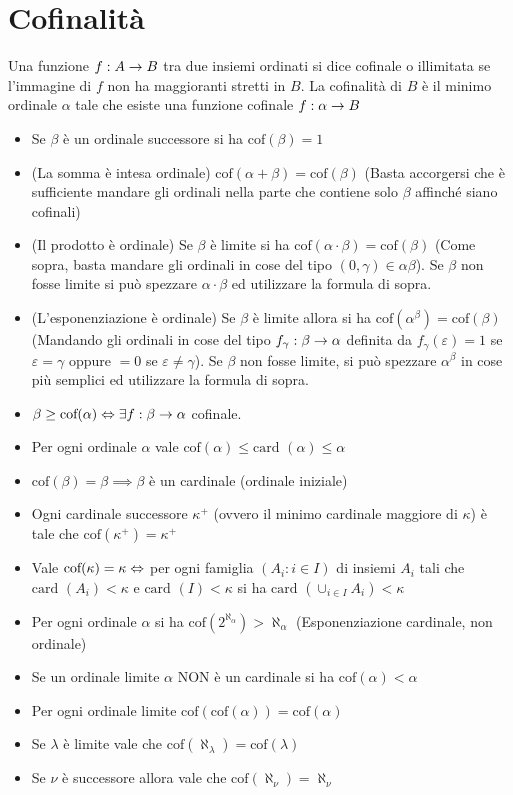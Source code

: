 \documentclass[a4paper,NoNotes,GeneralMath]{stdmdoc}
\newcommand{\card}[1]{\text{card }({#1})}
\newcommand{\cof}[1]{\text{cof}({#1})}
\begin{document}
	\section*{Cofinalità}
	Una funzione $f: A \rightarrow B$ tra due insiemi ordinati si dice cofinale o illimitata se l'immagine di $f$ non ha maggioranti stretti in $B$. La cofinalità di $B$ è il minimo ordinale $\alpha$ tale che esiste una funzione cofinale $f: \alpha \rightarrow B$
	\begin{itemize}
		\item Se $\beta$ è un ordinale successore si ha $\cof{\beta} = 1$
		\item (La somma è intesa ordinale) $\cof{\alpha + \beta} = \cof{\beta}$ (Basta accorgersi che è sufficiente mandare gli ordinali nella parte che contiene solo $\beta$ affinché siano cofinali)
		\item (Il prodotto è ordinale) Se $\beta$ è limite si ha $\cof{\alpha \cdot \beta} = \cof{\beta}$ (Come sopra, basta mandare gli ordinali in cose del tipo $(0, \gamma) \in \alpha\beta$). Se $\beta$ non fosse limite si può spezzare $\alpha \cdot \beta$ ed utilizzare la formula di sopra.
		\item (L'esponenziazione è ordinale) Se $\beta$ è limite allora si ha $\cof{\alpha^\beta} = \cof{\beta}$ (Mandando gli ordinali in cose del tipo $f_\gamma: \beta \rightarrow \alpha$ definita da $f_\gamma(\varepsilon) = 1$ se $\varepsilon = \gamma$ oppure $ = 0$ se $\varepsilon \neq \gamma$). Se $\beta$ non fosse limite, si può spezzare $\alpha^\beta$ in cose più semplici ed utilizzare la formula di sopra.
		\item $\beta \ge \cof{\alpha} \sse \exists f: \beta \rar \alpha$ cofinale.
		\item Per ogni ordinale $\alpha$ vale $\cof{\alpha} \le \card{\alpha} \le \alpha$
		\item $\cof{\beta} = \beta \implies \beta$ è un cardinale (ordinale iniziale)
		\item Ogni cardinale successore $\kappa^{+}$ (ovvero il minimo cardinale maggiore di $\kappa$) è tale che $\cof{\kappa^{+}} = \kappa^{+}$
		\item Vale $\cof{\kappa} = \kappa \sse $ per ogni famiglia $(A_i : i \in I)$ di insiemi $A_i$ tali che $\card{A_i} < \kappa$ e $\card{I} < \kappa$ si ha $\card{\cup_{i \in I} A_i} < \kappa$
		\item Per ogni ordinale $\alpha$ si ha $\cof{2^{\aleph_\alpha}} > \aleph_\alpha$ (Esponenziazione cardinale, non ordinale)
		\item Se un ordinale limite $\alpha$ NON è un cardinale si ha $\cof{\alpha} < \alpha$
		\item Per ogni ordinale limite $\cof{\cof{\alpha}} = \cof{\alpha}$
		\item Se $\lambda$ è limite vale che $\cof{\aleph_\lambda} = \cof{\lambda}$
		\item Se $\nu$ è successore allora vale che $\cof{\aleph_\nu} = \aleph_\nu$
	\end{itemize}
	
\end{document}
